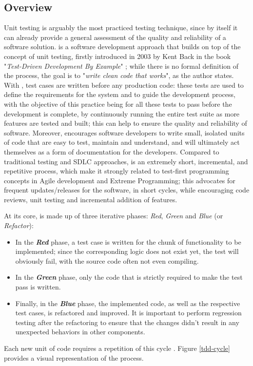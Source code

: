 \subsection{Overview}
Unit testing is arguably the most practiced testing technique, since by itself it can already provide a general assessment of the quality and reliability of a software solution. \tdd is a software development approach that builds on top of the concept of unit testing, firstly introduced in 2003 by Kent Back in the book "\textit{Test-Driven Development By Example}" \cite{TDDByExample}; while there is no formal definition of the process, the goal is to "\textit{write clean code that works}", as the author states. With \tdd, test cases are written before any production code: these tests are used to define the requirements for the system and to guide the development process, with the objective of this practice being for all these tests to pass before the development is complete, by continuously running the entire test suite as more features are tested and built; this can help to ensure the quality and reliability of software. Moreover, \tdd encourages software developers to write small, isolated units of code that are easy to test, maintain and understand, and will ultimately act themselves as a form of documentation for the developers. 
Compared to traditional testing and SDLC approaches, \tdd is an extremely short, incremental, and repetitive process, which make it strongly related to test-first programming concepts in Agile development and Extreme Programming; this advocates for frequent updates/releases for the software, in short cycles, while encouraging code reviews, unit testing and incremental addition of features.


At its core, \tdd is made up of three iterative phases: \textit{Red}, \textit{Green} and \textit{Blue} (or \textit{Refactor}):
\begin{itemize}
    \item In the \textbf{\textit{Red}} phase, a test case is written for the chunk of functionality to be implemented; since the corresponding logic does not exist yet, the test will obviously fail, with the source code often not even compiling.
    \item In the \textbf{\textit{Green}} phase, only the code that is strictly required to make the test pass is written.
    \item Finally, in the \textbf{\textit{Blue}} phase, the implemented code, as well as the respective test cases, is refactored and improved. It is important to perform regression testing after the refactoring to ensure that the changes didn't result in any unexpected behaviors in other components.
\end{itemize}
Each new unit of code requires a repetition of this cycle \cite{GuidelinesTDD}. Figure \ref{tdd-cycle} provides a visual representation of the \tdd process.

